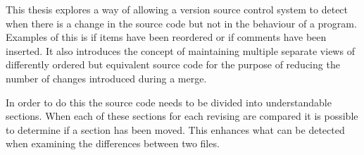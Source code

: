 This thesis explores a way of allowing a version source control system to detect when there is a change in the source code but not in the behaviour of a program.  Examples of this is if items have been reordered or if comments have been inserted.  It also introduces the concept of maintaining multiple separate views of differently ordered but equivalent source code for the purpose of reducing the number of changes introduced during a merge. 

In order to do this the source code needs to be divided into understandable sections. When each of these sections for each revising are compared it is possible to determine if a section has been moved.  This enhances what can be detected when examining the differences between two files.
